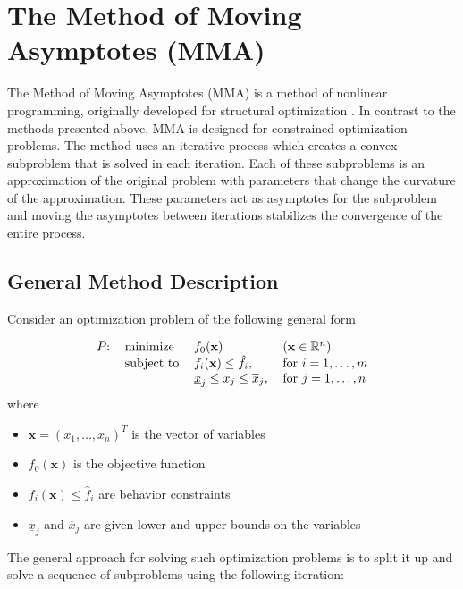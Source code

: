 \section{The Method of Moving Asymptotes (MMA)}\label{sec:MMA}

The Method of Moving Asymptotes (MMA) is a method of nonlinear programming, originally developed for structural optimization \cite{Svanberg1987}. In contrast to the methods presented above, MMA is designed for constrained optimization problems. The method uses an iterative process which creates a convex subproblem that is solved in each iteration. Each of these subproblems is an approximation of the original problem with parameters that change the curvature of the approximation. These parameters act as asymptotes for the subproblem and moving the asymptotes between iterations stabilizes the convergence of the entire process.

\subsection{General Method Description}
Consider an optimization problem of the following general form

\begin{equation}
	\begin{tabular}{llll}
		$P$: & minimize   & $f_0(\mathbf{x})$                                & $\left(\mathbf{x}\in\mathbb{R}^n\right)$ \\
		     & subject to & $f_i(\mathbf{x})\leq\hat{f}_i$,                  & for $i=1,\ldots,m$                    \\
		     &            & $\underline{x}_j\leq x_j\leq \overline{x}_j$, & for $j=1,\ldots,n$                    
	\end{tabular}
	\label{eqn:MMA-Opt}
\end{equation}
where
\begin{itemize}
	\item $\mathbf{x}=\left(x_1,\ldots,x_n\right)^T$ is the vector of variables
	\item $f_0(\mathbf{x})$ is the objective function
	\item $f_i(\mathbf{x})\leq\hat{f}_i$ are behavior constraints
	\item $\underline{x}_j$ and $\overline{x}_j$ are given lower and upper bounds on the variables
\end{itemize}

The general approach for solving such optimization problems is to split it up and solve a sequence of subproblems using the following iteration:

